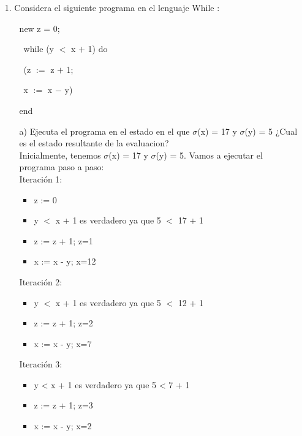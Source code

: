 \documentclass{article}
\begin{document}
    \begin{itemize}
        \item[1.] Considera el siguiente programa en el lenguaje While :
        \begin{itemize}
            \item[ ] new z = 0;
            \item[ ] \, while (y $<$ x $+$ 1) do
            \item[ ] \, (z $:=$ z $+$ 1;
            \item[ ] \, x $:=$ x $-$ y)
            \item[ ] end
        \end{itemize}

        \begin{itemize}
            \item[a)] Ejecuta el programa en el estado en el que $\sigma$(x) = 17 y $\sigma$(y) = 5 ¿Cual es el estado resultante de la evaluacion?\\
            Inicialmente, tenemos $\sigma$(x) = 17 y $\sigma$(y) = 5. Vamos a ejecutar el programa paso a paso:\\

            Iteración 1:
            \begin{itemize}
                \item z := 0
                \item y $<$ x + 1 es verdadero ya que 5 $<$ 17 + 1
                \item z := z + 1; z=1
                \item x := x - y; x=12
            \end{itemize}

            Iteración 2:
            \begin{itemize}
                \item y $<$ x + 1 es verdadero ya que 5 $<$ 12 + 1
                \item z := z + 1; z=2
                \item x := x - y; x=7
            \end{itemize}

            Iteración 3:
            \begin{itemize}
                \item y < x + 1 es verdadero ya que 5 < 7 + 1
                \item z := z + 1; z=3
                \item x := x - y; x=2
            \end{itemize}


\end{itemize}
\end{itemize}
\end{document}
